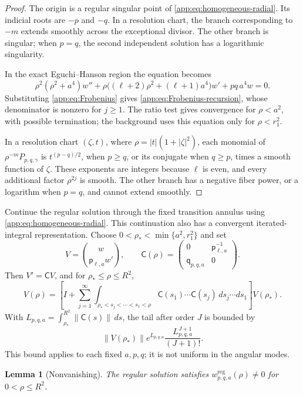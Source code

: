 \documentclass[11pt,a4paper,twoside]{article}
\numberwithin{equation}{section}
\newtheorem{lemma}[theorem]{Lemma}
\theoremstyle{definition}
\theoremstyle{remark}
\begin{document}
\begin{proof}
The origin is a regular singular point of
\eqref{app:eq:homogeneous-radial}. Its indicial roots are \(-p\)
and \(-q\). In a resolution chart, the branch corresponding to
\(-m\) extends smoothly across the exceptional divisor. The other
branch is singular; when \(p=q\), the second independent solution
has a logarithmic singularity.

In the exact Eguchi--Hanson region the equation becomes
\[
\rho^2(\rho^2+a^4)w''
+\rho\bigl((\ell+2)\rho^2+(\ell+1)a^4\bigr)w'
+pq\,a^4w=0.
\]
Substituting \eqref{app:eq:Frobenius} gives
\eqref{app:eq:Frobenius-recursion}, whose denominator is nonzero
for \(j\ge1\). The ratio test gives convergence for \(\rho<a^2\),
with possible termination; the background uses this equation only
for \(\rho<r_1^2\).

In a resolution chart \((\zeta,t)\), where
\(\rho=|t|(1+|\zeta|^2)\), each monomial of
\(\rho^{-m}P_{p,q,\gamma}\) is \(t^{(p-q)/2}\), when \(p\ge q\),
or its conjugate when \(q\ge p\), times a smooth function of
\(\zeta\). These exponents are integers because \(\ell\) is even,
and every additional factor \(\rho^{2j}\) is smooth. The other
branch has a negative fiber power, or a logarithm when \(p=q\),
and cannot extend smoothly.
\end{proof}

Continue the regular solution through the fixed transition annulus
using \eqref{app:eq:homogeneous-radial}. This continuation also has
a convergent iterated-integral representation. Choose
\(0<\rho_*<\min\{a^2,r_1^2\}\) and set
\[
V=\binom{w}{\mathsf p_{\ell,a}w'},
\qquad
\mathsf C(\rho)=
\begin{pmatrix}
0&\mathsf p_{\ell,a}^{-1}\\
\mathsf q_{p,q,a}&0
\end{pmatrix}.
\]
Then \(V'=\mathsf C V\), and for \(\rho_*\le\rho\le R^2\),
\begin{equation}\label{app:eq:Volterra-series}
V(\rho)=\left[I+\sum_{j=1}^{\infty}
\int_{\rho_*<s_j<\cdots<s_1<\rho}
\mathsf C(s_1)\cdots\mathsf C(s_j)\,ds_j\cdots ds_1\right]V(\rho_*).
\end{equation}
With \(L_{p,q,a}=\int_{\rho_*}^{R^2}\|\mathsf C(s)\|\,ds\),
the tail after order \(J\) is bounded by
\[
\|V(\rho_*)\|e^{L_{p,q,a}}
\frac{L_{p,q,a}^{J+1}}{(J+1)!}.
\]
This bound applies to each fixed \(a,p,q\); it is not uniform in
the angular modes.

\begin{lemma}[Nonvanishing]
\label{app:lem:regular-nonvanishing}
The regular solution satisfies
\(w_{p,q,a}^{\mathrm{reg}}(\rho)\ne0\) for \(0<\rho\le R^2\).
\end{lemma}
\end{document}
